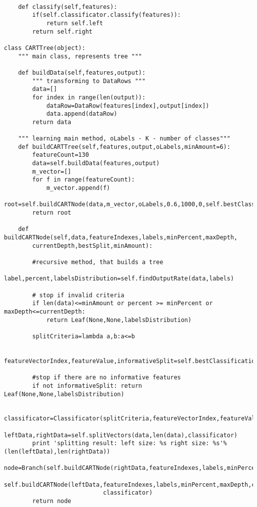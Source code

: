 \begin{lstlisting}[style=python,caption=Classification tree]
        
    def classify(self,features):
        if(self.classificator.classify(features)):
            return self.left
        return self.right

class CARTTree(object):
    """ main class, represents tree """

    def buildData(self,features,output):
    	""" transforming to DataRows """
        data=[]
        for index in range(len(output)):
            dataRow=DataRow(features[index],output[index])
            data.append(dataRow)
        return data
    
    """ learning main method, oLabels - K - number of classes"""
    def buildCARTTree(self,features,output,oLabels,minAmount=6):
        featureCount=130
        data=self.buildData(features,output)                
        m_vector=[]
        for f in range(featureCount):
            m_vector.append(f)
        root=self.buildCARTNode(data,m_vector,oLabels,0.6,1000,0,self.bestClassificationSplit,minAmount)
        return root
        
    def buildCARTNode(self,data,featureIndexes,labels,minPercent,maxDepth,
    	currentDepth,bestSplit,minAmount):

    	#recursive method, that builds a tree
        label,percent,labelsDistribution=self.findOutputRate(data,labels)    

        # stop if invalid criteria
        if len(data)<=minAmount or percent >= minPercent or maxDepth<=currentDepth:
            return Leaf(None,None,labelsDistribution)
    
        splitCriteria=lambda a,b:a<=b
    
        featureVectorIndex,featureValue,informativeSplit=self.bestClassificationSplit(data,featureIndexes,labels,splitCriteria)

    	#stop if there are no informative features
        if not informativeSplit: return Leaf(None,None,labelsDistribution)
        
        classificator=Classificator(splitCriteria,featureVectorIndex,featureValue)
        leftData,rightData=self.splitVectors(data,len(data),classificator)
        print 'splitting result: left size: %s right size: %s'%(len(leftData),len(rightData))    
        node=Branch(self.buildCARTNode(rightData,featureIndexes,labels,minPercent,maxDepth,currentDepth+1,bestSplit,minAmount),
                      self.buildCARTNode(leftData,featureIndexes,labels,minPercent,maxDepth,currentDepth+1,bestSplit,minAmount),
                            classificator)
        return node



\end{lstlisting}
